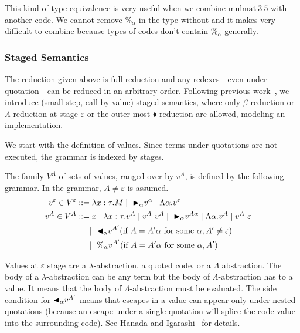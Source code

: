 This kind of type equivalence is very useful when we combine $\text{mulmat}\ 3\ 5$ with another code.
We cannot remove $\%_\alpha$ in the type without \QPercent and it makes very difficult to combine
because types of codes don't contain $\%_\alpha$ generally.


\subsubsection{Staged Semantics}

The reduction given above is full reduction and any redexes---even
under quotation---can be reduced in an arbitrary order.
Following previous work~\cite{Hanada2014},
we introduce (small-step, call-by-value) staged semantics,
where only $\beta$-reduction or $\Lambda$-reduction at stage $\varepsilon$ or the outer-most $\blacklozenge$-reduction are allowed,
modeling an implementation.

We start with the definition of values. Since terms under quotations are
not executed, the grammar is indexed by stages.

\begin{definition}[Values]
    The family $V^A$ of sets of values, ranged over by $v^A$,
    is defined by the following grammar.  In the grammar, $A \neq \varepsilon$ is assumed.
    \begin{align*}
        v^\varepsilon \in V^\varepsilon & ::= \lambda x:\tau.M \mid\ {\mathop{\blacktriangleright}}_\alpha v^\alpha \mid \Lambda\alpha.v^\varepsilon                                       & \\
        v^A \in V^A                     & ::= x \mid \lambda x:\tau.v^A \mid v^A\ v^A \mid\ {\mathop{\blacktriangleright}}_\alpha v^{A\alpha} \mid \Lambda\alpha.v^A \mid v^A\ \varepsilon & \\
                                        & \quad\   \mid\ {\mathop{\blacktriangleleft}}_\alpha v^{A'} (\text{if } A = A'\alpha \text{ for some } \alpha, A' \neq \varepsilon)             & \\
                                        & \quad\   \mid\ \%_\alpha v^{A'} (\text{if } A = A'\alpha  \text{ for some } \alpha, A')
    \end{align*}
\end{definition}

Values at $\varepsilon$ stage are a $\lambda$-abstraction, a quoted code,
or a $\Lambda$ abstraction.  The body of a $\lambda$-abstraction can
be any term but the body of $\Lambda$-abstraction has to a value.  It
means that the body of $\Lambda$-abstraction must be evaluated.  The
side condition for ${\mathop{\blacktriangleleft}}_\alpha v^{A'}$ means that escapes in a value
can appear only under nested quotations (because an escape under a
single quotation will splice the code value into the surrounding
code).  See Hanada and Igarashi~\cite{Hanada2014} for details.


